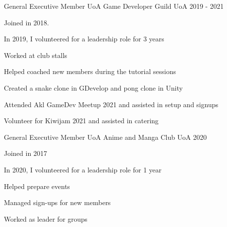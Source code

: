 

\begin{cventries}

  \cventry
    {General Executive Member} %
    {UoA Game Developer Guild} %
    {UoA} %
    {2019 - 2021} %
    {
      \begin{cvitems} %
        \item {Joined in 2018.}
        \item {In 2019, I volunteered for a leadership role for 3 years}
        \item {Worked at club stalls}
        \item {Helped coached new members during the tutorial sessions}
        \item {Created a snake clone in GDevelop and pong clone in Unity}
        \item {Attended Akl GameDev Meetup 2021 and assisted in setup and signups}
        \item {Volunteer for Kiwijam 2021 and assisted in catering}
      \end{cvitems}
    }

  \cventry
    {General Executive Member} %
    {UoA Anime and Manga Club} %
    {UoA} %
    {2020} %
    {
      \begin{cvitems} %
        \item {Joined in 2017}
        \item {In 2020, I volunteered for a leadership role for 1 year}
        \item {Helped prepare events}
        \item {Managed sign-ups for new members}
        \item {Worked as leader for groups}
      \end{cvitems}
    }


\end{cventries}
